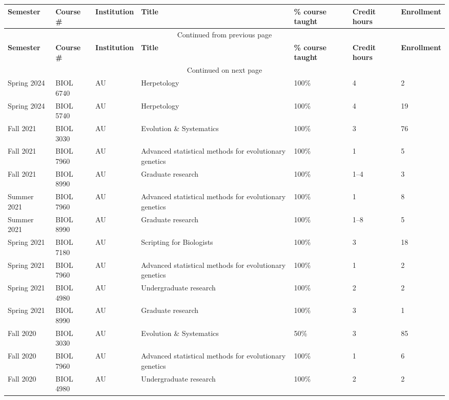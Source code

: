 {\sffamily\small
{}
\begin{longtable}[l]{ p{0.79in} p{0.65in} p{0.60in} p{1.7in} p{0.58in} p{0.34in} p{0.70in} }
    \hline
    \textbf{Semester} & \textbf{Course \#} & \textbf{Institution} & \textbf{Title} & \textbf{\% course taught} & \textbf{Credit hours} & \textbf{Enrollment} \\
    \hline
    \endfirsthead
    \multicolumn{7}{c}{{Continued from previous page}} \\
    \hline
    \textbf{Semester} & \textbf{Course \#} & \textbf{Institution} & \textbf{Title} & \textbf{\% course taught} & \textbf{Credit hours} & \textbf{Enrollment} \\
    \hline
    \endhead
    \hline \multicolumn{7}{c}{{Continued on next page}} \\
    \endfoot
    \hline
    \endlastfoot
    Spring 2024 & BIOL 6740 & AU & Herpetology & 100\% & 4 & 2 \\
    Spring 2024 & BIOL 5740 & AU & Herpetology & 100\% & 4 & 19 \\
    Fall 2021 & BIOL 3030 & AU & Evolution \& Systematics & 100\% & 3 & 76 \\
    Fall 2021 & BIOL 7960 & AU & Advanced statistical methods for evolutionary genetics & 100\% & 1 & 5 \\
    Fall 2021 & BIOL 8990 & AU & Graduate research & 100\% & 1--4 & 3 \\ 
    Summer 2021 & BIOL 7960 & AU & Advanced statistical methods for evolutionary genetics & 100\% & 1 & 8 \\
    Summer 2021 & BIOL 8990 & AU & Graduate research & 100\% & 1--8 & 5 \\ 
    Spring 2021 & BIOL 7180 & AU & Scripting for Biologists & 100\% & 3 & 18 \\
    Spring 2021 & BIOL 7960 & AU & Advanced statistical methods for evolutionary genetics & 100\% & 1 & 2 \\
    Spring 2021 & BIOL 4980 & AU & Undergraduate research & 100\% & 2 & 2 \\ 
    Spring 2021 & BIOL 8990 & AU & Graduate research & 100\% & 3 & 1 \\ 
    Fall 2020 & BIOL 3030 & AU & Evolution \& Systematics & 50\% & 3 & 85 \\
    Fall 2020 & BIOL 7960 & AU & Advanced statistical methods for evolutionary genetics & 100\% & 1 & 6 \\
    Fall 2020 & BIOL 4980 & AU & Undergraduate research & 100\% & 2 & 2 \\ 

\end{longtable}}
